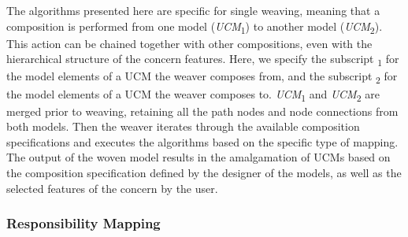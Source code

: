 The algorithms presented here are specific for single weaving, meaning that a composition is performed from one model (\emph{UCM}\textsubscript{1}) to another model (\emph{UCM}\textsubscript{2}). This action can be chained together with other compositions, even with the hierarchical structure of the concern features. Here, we specify the subscript \textsubscript{1} for the model elements of a UCM the weaver composes from, and the subscript \textsubscript{2} for the model elements of a UCM the weaver composes to. \emph{UCM}\textsubscript{1} and \emph{UCM}\textsubscript{2} are merged prior to weaving, retaining all the path nodes and node connections from both models. Then the weaver iterates through the available composition specifications and executes the algorithms based on the specific type of mapping. The output of the woven model results in the amalgamation of UCMs based on the composition specification defined by the designer of the models, as well as the selected features of the concern by the user.

\subsubsection{Responsibility Mapping} \label{sec:3.2.1.1}


